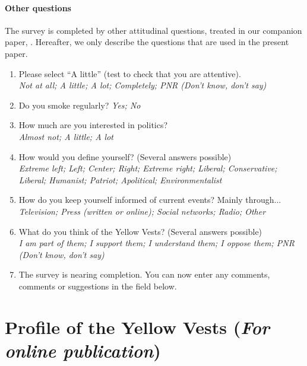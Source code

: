 \documentclass[12pt]{article} %
\begin{document}
\begin{appendices}
\paragraph{Other questions}

The survey is completed by other attitudinal questions, treated in
our companion paper, \citet{douenne_french_2019}. Hereafter, we only describe the questions
that are used in the present paper.
\begin{enumerate}[resume,leftmargin=*]
\item Please select ``A little'' (test to check that you are attentive).
\emph{}\\
\emph{Not at all; A little; A lot; Completely; PNR (Don't know, don't
say)}
\item Do you smoke regularly? \emph{Yes; No}
\item How much are you interested in politics? \emph{}\\
\emph{Almost not; A little; A lot }
\item How would you define yourself? (Several answers possible) \emph{}\\
\emph{Extreme left; Left; Center; Right; Extreme right; Liberal; Conservative;
Liberal; Humanist; Patriot; Apolitical; Environmentalist }
\item How do you keep yourself informed of current events? Mainly through...
\emph{}\\
\emph{Television; Press (written or online); Social networks; Radio;
Other}
\item What do you think of the Yellow Vests? (Several answers possible)
\emph{}\\
\emph{I am part of them; I support them; I understand them; I oppose
them; PNR (Don't know, don't say)}
\item The survey is nearing completion. You can now enter any comments,
comments or suggestions in the field below.
\end{enumerate}

\clearpage
\section{Profile of the Yellow Vests (\emph{For online publication})} \label{sec:profile_yellow_vests} 


\end{appendices}
\end{document}
